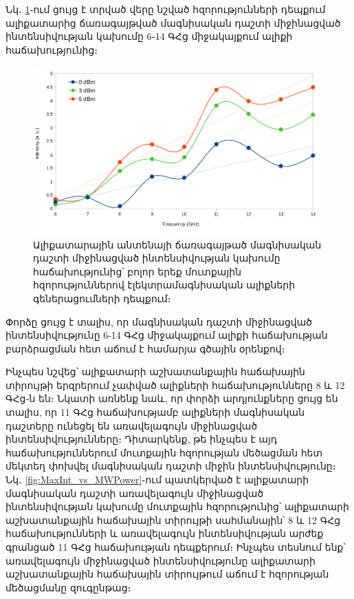 \documentclass[12pt, fleqn]{report}
\begin{document}
Նկ․ \ref{fig:Int_vs_Freq_0_3_6_dBm}֊ում ցույց է տրված վերը նշված հզորությունների դեպքում ալիքատարից ճառագայթված մագնիսական դաշտի միջինացված ինտենսիվության կախումը 6֊14 ԳՀց միջակայքում ալիքի հաճախությունից։
\begin{figure}
    \centering
    \includegraphics[width=1.0\textwidth]{data/experiment-results/free_field_of_antenna_6-14GHz_0-6dBm_generator_output_distance_5mm.png}
    \caption{Ալիքատարային անտենայի ճառագայթած մագնիսական դաշտի միջինացված ինտենսիվության կախումը հաճախությունից՝ բոլոր երեք մուտքային հզորություններով էլեկտրամագնիսական ալիքների գեներացումների դեպքում։}
    \label{fig:Int_vs_Freq_0_3_6_dBm}
\end{figure}
Փորձը ցույց է տալիս, որ մագնիսական դաշտի միջինացված ինտենսիվությունը 6-14 ԳՀց միջակայքում ալիքի հաճախության բարձրացման հետ աճում է համարյա գծային օրենքով։

Ինչպես նշվեց՝ ալիքատարի աշխատանքային հաճախային տիրույթի երզրերում չափված ալիքների հաճախությունները 8 և 12 ԳՀց֊ն են։ Նկատի առնենք նաև, որ փորձի արդյունքները ցույց են տալիս, որ 11 ԳՀց հաճախությամբ ալիքների մագնիսական դաշտերը ունեցել են առավելագույն միջինացված ինտենսիվությունները։ Դիտարկենք, թե ինչպես է այդ հաճախություններում մուտքային հզորության մեծացման հետ մեկտեղ փոխվել մագնիսական դաշտի միջին ինտենսիվությունը։ Նկ․ \ref{fig:MaxInt_vs_MWPower}֊ում պատկերված է ալիքատարի մագնիսական դաշտի առավելագույն միջինացված ինտենսիվության կախումը մուտքային հզորությունից՝ ալիքատարի աշխատանքային հաճախային տիրույթի սահմանային՝ 8 և 12 ԳՀց հաճախությունների և առավելագույն ինտենսիվության արժեք գրանցած 11 ԳՀց հաճախության դեպքերում։ Ինչպես տեսնում ենք՝ առավելագույն միջինացված ինտենսիվությունը ալիքատարի աշխատանքային հաճախային տիրույթում աճում է հզորության մեծացմանը զուգընթաց։
\end{document}
